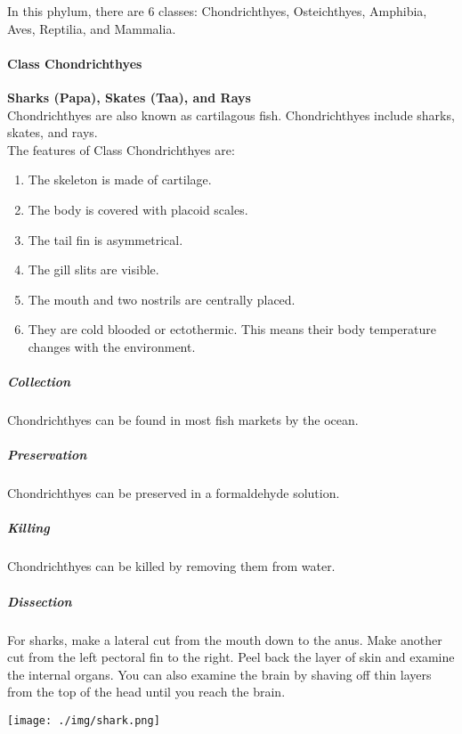 \begin{multicols}{2}
In this phylum, there are 6 classes: Chondrichthyes, Osteichthyes, Amphibia, Aves, Reptilia, and Mammalia.

\paragraph{Class Chondrichthyes}
\textbf{Sharks (Papa), Skates (Taa), and Rays}\\
Chondrichthyes are also known as cartilagous fish. Chondrichthyes include sharks, skates, and rays.\\
The features of Class Chondrichthyes are:
\begin{enumerate}
\item{The skeleton is made of cartilage.}
\item{The body is covered with placoid scales.}
\item{The tail fin is asymmetrical.}
\item{The gill slits are visible.}
\item{The mouth and two nostrils are centrally placed.}
\item{They are cold blooded or ectothermic. This means their body temperature changes with the environment.}
\end{enumerate}

\subparagraph{Collection}
Chondrichthyes can be found in most fish markets by the ocean. 

\subparagraph{Preservation} 
Chondrichthyes can be preserved in a formaldehyde solution.

\subparagraph{Killing}
Chondrichthyes can be killed by removing them from water. 

\subparagraph{Dissection}
For sharks, make a lateral cut from the mouth down to the anus. Make another cut from the left pectoral fin to the right. Peel back the layer of skin and examine the internal organs. You can also examine the brain by shaving off thin layers from the top of the head until you reach the brain.

\begin{center}
\texttt{[image: ./img/shark.png]}
\end{center}

%


\end{multicols}
